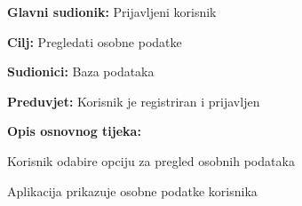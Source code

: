 					\noindent {}
					\begin{packed_item}
						
						\item \textbf{Glavni sudionik: } Prijavljeni korisnik
						\item  \textbf{Cilj:} Pregledati osobne podatke
						\item  \textbf{Sudionici:} Baza podataka
						\item  \textbf{Preduvjet:} Korisnik je registriran i prijavljen
						\item  \textbf{Opis osnovnog tijeka:}
						
						\item[] \begin{packed_enum}
							
							\item Korisnik odabire opciju za pregled osobnih podataka
							\item Aplikacija prikazuje osobne podatke korisnika
						\end{packed_enum}
					
					\end{packed_item}
					
